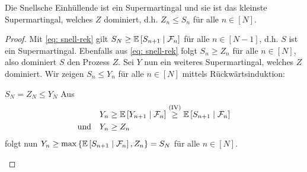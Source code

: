 \begin{theorem} %
	\label{theorem: 6.3}
	Die Snellsche Einhüllende ist ein Supermartingal und sie ist das kleinste Supermartingal, welches $Z$ dominiert, d.h. $Z_n \le S_n$ für alle $n \in [N]$.
\end{theorem}
\begin{proof}
	Mit \eqref{eq: snell-rek} gilt $S_N \ge \mathbb{E} \left[ S_{n+1} \mid \mathcal{F}_n \right]$ für alle $n \in [N-1]$, d.h. $S$ ist ein Supermartingal. Ebenfalls aus \eqref{eq: snell-rek} folgt $S_n \ge Z_n$ für alle $n \in [N]$, also dominiert $S$ den Prozess $Z$. Sei $Y$ nun ein weiteres Supermartingal, welches $Z$ dominiert. Wir zeigen $S_n \le Y_n$ für alle $n \in [N]$ mittels Rückwärtsinduktion:
	\begin{induction}
		\ianfang[$n = N$] $S_N = Z_N \le Y_N$
		\ischritt[$n+1 \to n$] Aus
		\begin{equation*}
			\begin{aligned}
			Y_n &\ge \mathbb{E} \left[ Y_{n+1} \mid \mathcal{F}_n \right] \overset{\text{(IV)}}{\ge} \mathbb{E} \left[ S_{n+1} \mid \mathcal{F}_n \right] \\
			\text{und} \quad Y_n &\ge Z_n
			\end{aligned}
		\end{equation*}
		folgt nun $Y_n \ge \max\left\{ \mathbb{E} \left[ S_{n+1} \mid \mathcal{F}_n \right], Z_n \right\} = S_N$ für alle $n \in [N]$.
	\end{induction}
\end{proof}

